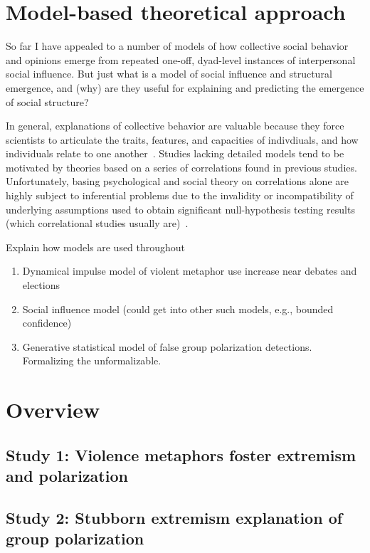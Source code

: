\documentclass[12pt,letterpaper]{article}
\begin{document}
\section{Model-based theoretical approach}

So far I have appealed to a number of models of how collective social 
behavior and opinions emerge from repeated one-off, 
dyad-level instances of interpersonal social influence. But just what is
a model of social influence and structural emergence, 
and (why) are they useful for explaining and predicting the
emergence of social structure? 

In general, explanations of collective behavior are valuable because they force
scientists to articulate the traits, features, and capacities of indivdiuals,
and how individuals relate to one another~\cite{Kauffman1970,Wimsatt2013}.
Studies lacking detailed models tend to be motivated by theories based on
a series of correlations found in previous studies. Unfortunately, basing
psychological and social theory on correlations alone are highly subject
to inferential problems due to the invalidity or incompatibility of 
underlying assumptions used to obtain significant null-hypothesis testing
results (which correlational studies usually are)~\cite{Meehl1990}.

Explain how models are used throughout
\begin{enumerate}
  \item 
    Dynamical impulse model of violent metaphor use 
    increase near debates and elections
  \item
    Social influence model (could get into other such models, e.g., bounded confidence)
  \item
    Generative statistical model of false group polarization detections.
    Formalizing the unformalizable.
\end{enumerate}

\section{Overview}


\subsection{Study 1: Violence metaphors foster extremism and polarization}

\subsection{Study 2: Stubborn extremism explanation of group polarization}
\end{document}
